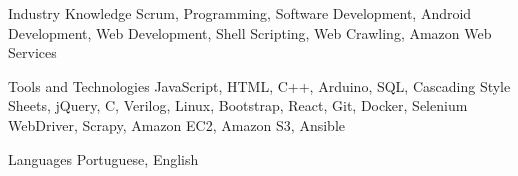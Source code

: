 


\begin{cvskills}


\cvskill
{Industry Knowledge} %
{Scrum, Programming, Software Development, Android Development, Web Development, Shell Scripting, Web Crawling, Amazon Web Services} %


\cvskill
{Tools and Technologies} %
{JavaScript, HTML, C++, Arduino, SQL, Cascading Style Sheets, jQuery, C, Verilog, Linux, Bootstrap, React, Git, Docker, Selenium WebDriver, Scrapy, Amazon EC2, Amazon S3, Ansible} %


\cvskill
{Languages} %
{Portuguese, English} %


\end{cvskills}